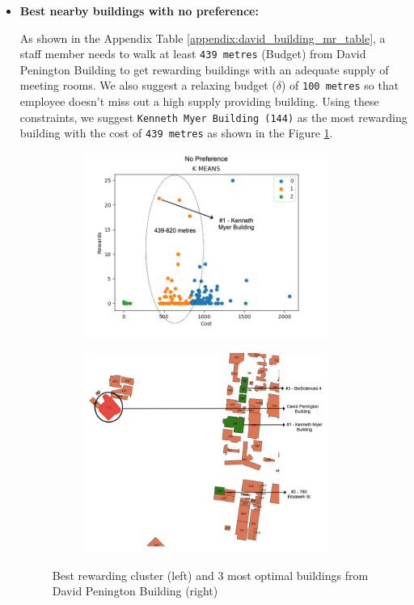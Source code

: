 \begin{itemize}
    \item \textbf{Best nearby buildings with no preference:}
    
    As shown in the Appendix Table \ref{appendix:david_building_mr_table}, a staff member needs to walk at least \texttt{439 metres} (Budget) from David Penington Building to get rewarding buildings with an adequate supply of meeting rooms. We also suggest a relaxing budget ($\delta$) of \texttt{100 metres} so that employee doesn't miss out a high supply providing building. Using these constraints, we suggest \texttt{Kenneth Myer Building (144)} as the most rewarding building with the cost of \texttt{439 metres} as shown in the Figure \ref{fig:david-mr-no-factors}.
    
    \begin{figure}[H]
\begin{subfigure}{.5\textwidth}
\centering
  \includegraphics[width=8cm]{resources/images/spatial-mr/david-mr/david_02.png}
\end{subfigure}%
\begin{subfigure}{.5\textwidth}
  \centering
  \includegraphics[width=8cm]{resources/images/spatial-mr/david-mr/david_03.png}
\end{subfigure}
\caption{Best rewarding cluster (left) and 3 most optimal buildings from David Penington Building (right)}
\label{fig:david-mr-no-factors}
\end{figure}


\end{itemize}
